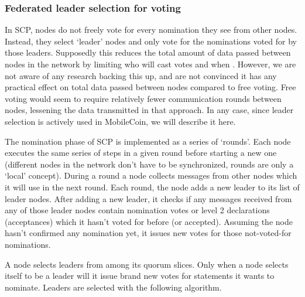 \subsubsection{Federated leader selection for voting}

In SCP, nodes do not freely vote for every nomination they see from other nodes. Instead, they select `leader' nodes and only vote for the nominations voted for by those leaders. Supposedly this reduces the total amount of data passed between nodes in the network by limiting who will cast votes and when \cite{stellar-consensus-protocol}. However, we are not aware of any research backing this up, and are not convinced it has any practical effect on total data passed between nodes compared to free voting. Free voting would seem to require relatively fewer communication rounds between nodes, lessening the data transmitted in that approach. In any case, since leader selection is actively used in MobileCoin, we will describe it here.

The nomination phase of SCP is implemented as a series of `rounds'. Each node executes the same series of steps in a given round before starting a new one (different nodes in the network don't have to be synchronized, rounds are only a `local' concept). During a round a node collects messages from other nodes which it will use in the next round. Each round, the node adds a new leader to its list of leader nodes. After adding a new leader, it checks if any messages received from any of those leader nodes contain nomination votes or level 2 declarations (acceptances) which it hasn't voted for before (or accepted). Assuming the node hasn't confirmed any nomination yet, it issues new votes for those not-voted-for nominations.

A node selects leaders from among its quorum slices. Only when a node selects itself to be a leader will it issue brand new votes for statements it wants to nominate. Leaders are selected with the following algorithm.

